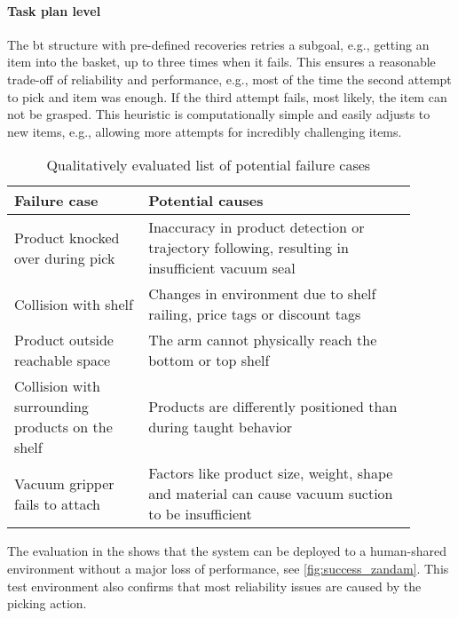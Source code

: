 \paragraph{Task plan level} The \ac{bt} structure with pre-defined recoveries retries a subgoal, e.g., getting an item into the basket, up to three times when it fails. This ensures a reasonable trade-off of reliability and performance, e.g., most of the time the second attempt to pick and item was enough. If the third attempt fails, most likely, the item can not be grasped. This heuristic is computationally simple and easily adjusts to new items, e.g., allowing more attempts for incredibly challenging items.
\begin{table*}[t]
    \centering
    \begin{tabular}{p{0.3\linewidth}p{0.6\linewidth}}
        \toprule
        Failure case & Potential causes \\
        \midrule
        Product knocked over during pick & Inaccuracy in product detection or trajectory following, resulting in insufficient vacuum seal \\
        Collision with shelf & Changes in environment due to shelf railing, price tags or discount tags \\
        Product outside reachable space  & The arm cannot physically reach the bottom or top shelf \\
        Collision with surrounding products on the shelf & Products are differently positioned than during taught behavior \\
        Vacuum gripper fails to attach & Factors like product size, weight, shape and material can cause vacuum suction to be insufficient \\
        \bottomrule
    \end{tabular}
    \caption{Qualitatively evaluated list of potential failure cases}
    \label{tab:failure_cases}
\end{table*}


The evaluation in the \realsupermarket{} shows that the system
can be deployed to a human-shared environment without a major loss of performance, see
\cref{fig:success_zandam}. This test environment also
confirms that most reliability issues are caused by the
picking action.








